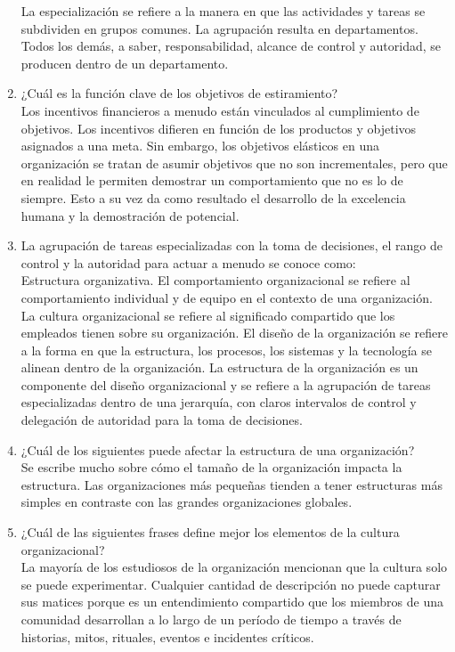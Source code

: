 \documentclass[10pt]{book}
\begin{document}
\begin{enumerate}[\bfseries 1.]
La especialización se refiere a la manera en que las actividades y tareas se subdividen en grupos comunes. La agrupación resulta en departamentos. Todos los demás, a saber, responsabilidad, alcance de control y autoridad, se producen dentro de un departamento.
\item ¿Cuál es la función clave de los objetivos de estiramiento?\\
Los incentivos financieros a menudo están vinculados al cumplimiento de objetivos. Los incentivos difieren en función de los productos y objetivos asignados a una meta. Sin embargo, los objetivos elásticos en una organización se tratan de asumir objetivos que no son incrementales, pero que en realidad le permiten demostrar un comportamiento que no es lo de siempre. Esto a su vez da como resultado el desarrollo de la excelencia humana y la demostración de potencial.
\item La agrupación de tareas especializadas con la toma de decisiones, el rango de control y la autoridad para actuar a menudo se conoce como:\\
Estructura organizativa. El comportamiento organizacional se refiere al comportamiento individual y de equipo en el contexto de una organización. La cultura organizacional se refiere al significado compartido que los empleados tienen sobre su organización. El diseño de la organización se refiere a la forma en que la estructura, los procesos, los sistemas y la tecnología se alinean dentro de la organización. La estructura de la organización es un componente del diseño organizacional y se refiere a la agrupación de tareas especializadas dentro de una jerarquía, con claros intervalos de control y delegación de autoridad para la toma de decisiones.
\item ¿Cuál de los siguientes puede afectar la estructura de una organización?\\
Se escribe mucho sobre cómo el tamaño de la organización impacta la estructura. Las organizaciones más pequeñas tienden a tener estructuras más simples en contraste con las grandes organizaciones globales.
\item ¿Cuál de las siguientes frases define mejor los elementos de la cultura organizacional?
\\
La mayoría de los estudiosos de la organización mencionan que la cultura solo se puede experimentar. Cualquier cantidad de descripción no puede capturar sus matices porque es un entendimiento compartido que los miembros de una comunidad desarrollan a lo largo de un período de tiempo a través de historias, mitos, rituales, eventos e incidentes críticos.
\end{enumerate}
\end{document}
